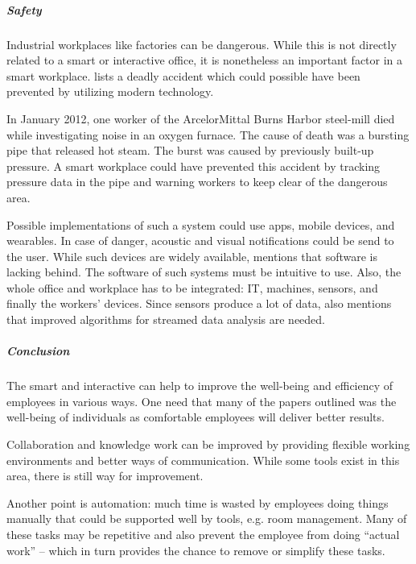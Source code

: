 \subparagraph{Safety}\label{sec:sda-safety}
Industrial workplaces like factories can be dangerous. While this is not directly related to a smart or interactive office, it is nonetheless an important factor in a smart workplace. \cite{sda-wired} lists a deadly accident which could possible have been prevented by utilizing modern technology.

In January 2012, one worker of the ArcelorMittal Burns Harbor steel-mill died while investigating noise in an oxygen furnace. The cause of death was a bursting pipe that released hot steam. The burst was caused by previously built-up pressure. A smart workplace could have prevented this accident by tracking pressure data in the pipe and warning workers to keep clear of the dangerous area.

Possible implementations of such a system could use apps, mobile devices, and wearables. In case of danger, acoustic and visual notifications could be send to the user. While such devices are widely available, \cite{sda-wired} mentions that software is lacking behind. The software of such systems must be intuitive to use. Also, the whole office and workplace has to be integrated: IT, machines, sensors, and finally the workers' devices. Since sensors produce a lot of data, \cite{sda-wired} also mentions that improved algorithms for streamed data analysis are needed.


\subparagraph{Conclusion}
The smart and interactive can help to improve the well-being and efficiency of employees in various ways. One need that many of the papers outlined was the well-being of individuals as comfortable employees will deliver better results.

Collaboration and knowledge work can be improved by providing flexible working environments and better ways of communication. While some tools exist in this area, there is still way for improvement. 

Another point is automation: much time is wasted by employees doing things manually that could be supported well by tools, e.g. room management. Many of these tasks may be repetitive and also prevent the employee from doing ``actual work'' -- which in turn provides the chance to remove or simplify these tasks.
